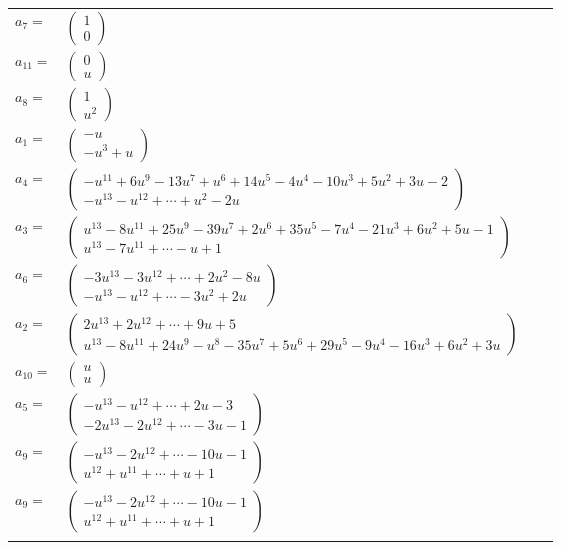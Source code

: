 \documentclass[1p]{elsarticle_modified}
\theoremstyle{definition}
\begin{document}
\begin{tabular}{m{7pt} m{180pt} m{7pt} m{180pt} }
\flushright $a_{7}=$&$\begin{pmatrix}1\\0\end{pmatrix}$ \\
\flushright $a_{11}=$&$\begin{pmatrix}0\\u\end{pmatrix}$ \\
\flushright $a_{8}=$&$\begin{pmatrix}1\\u^2\end{pmatrix}$ \\
\flushright $a_{1}=$&$\begin{pmatrix}- u\\- u^3+u\end{pmatrix}$ \\
\flushright $a_{4}=$&$\begin{pmatrix}- u^{11}+6 u^9-13 u^7+u^6+14 u^5-4 u^4-10 u^3+5 u^2+3 u-2\\- u^{13}- u^{12}+\cdots+u^2-2 u\end{pmatrix}$ \\
\flushright $a_{3}=$&$\begin{pmatrix}u^{13}-8 u^{11}+25 u^9-39 u^7+2 u^6+35 u^5-7 u^4-21 u^3+6 u^2+5 u-1\\u^{13}-7 u^{11}+\cdots- u+1\end{pmatrix}$ \\
\flushright $a_{6}=$&$\begin{pmatrix}-3 u^{13}-3 u^{12}+\cdots+2 u^2-8 u\\- u^{13}- u^{12}+\cdots-3 u^2+2 u\end{pmatrix}$ \\
\flushright $a_{2}=$&$\begin{pmatrix}2 u^{13}+2 u^{12}+\cdots+9 u+5\\u^{13}-8 u^{11}+24 u^9- u^8-35 u^7+5 u^6+29 u^5-9 u^4-16 u^3+6 u^2+3 u\end{pmatrix}$ \\
\flushright $a_{10}=$&$\begin{pmatrix}u\\u\end{pmatrix}$ \\
\flushright $a_{5}=$&$\begin{pmatrix}- u^{13}- u^{12}+\cdots+2 u-3\\-2 u^{13}-2 u^{12}+\cdots-3 u-1\end{pmatrix}$ \\
\flushright $a_{9}=$&$\begin{pmatrix}- u^{13}-2 u^{12}+\cdots-10 u-1\\u^{12}+u^{11}+\cdots+u+1\end{pmatrix}$\\ \flushright $a_{9}=$&$\begin{pmatrix}- u^{13}-2 u^{12}+\cdots-10 u-1\\u^{12}+u^{11}+\cdots+u+1\end{pmatrix}$\\&\end{tabular}
\end{document}
